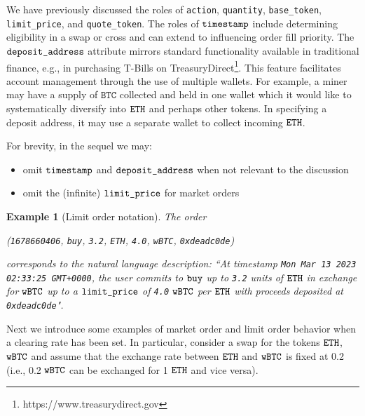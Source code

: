 \documentclass[11pt, reqno]{amsart}
\newtheorem{example}[thm]{Example}
\newcommand{\BTC}{\textnormal{\texttt{wBTC}}}
\newcommand{\ETH}{\textnormal{\texttt{ETH}}}
\newcommand{\timestamp}{\textnormal{\texttt{timestamp}}}
\newcommand{\action}{\textnormal{\texttt{action}}}
\newcommand{\quantity}{\textnormal{\texttt{quantity}}}
\newcommand{\basetoken}{\textnormal{\texttt{base\_token}}}
\newcommand{\limitprice}{\textnormal{\texttt{limit\_price}}}
\newcommand{\quotetoken}{\textnormal{\texttt{quote\_token}}}
\newcommand{\depositaddress}{\textnormal{\texttt{deposit\_address}}}
\newcommand{\buy}{\textnormal{\texttt{buy}}}
\begin{document}
We have previously discussed the roles of \action, \quantity, \basetoken,
\limitprice, and \quotetoken.
The roles of $\timestamp$ include determining eligibility in a swap or
cross and can extend to influencing order fill priority.
The $\depositaddress$ attribute mirrors standard functionality
available in traditional finance, e.g., in purchasing T-Bills on
TreasuryDirect\footnote{https://www.treasurydirect.gov}. This feature
facilitates account management through the use of multiple wallets. For
example, a miner may have a supply of $\texttt{BTC}$ collected and held in one wallet
which it would like to systematically diversify into $\ETH$ and perhaps other
tokens. In specifying a deposit address, it may use a separate wallet to collect
incoming $\ETH$.

For brevity, in the sequel we may:
\begin{itemize}
	\item omit $\timestamp$ and $\depositaddress$ when not relevant to the
        discussion
	\item omit the (infinite) $\limitprice$ for market orders
\end{itemize}

\begin{example}[Limit order notation]
The order
\begin{center}
    (\textnormal{\texttt{1678660406}},
    \buy,
    \textnormal{\texttt{3.2}},
    \ETH,
    \textnormal{\texttt{4.0}},
    \BTC,
    \textnormal{\texttt{0xdeadc0de}})
\end{center}
corresponds to the natural language description:
``At timestamp \textnormal{\texttt{Mon Mar 13 2023 02:33:25 GMT+0000}}, the user
commits to $\buy$ up to \textnormal{\texttt{3.2}} units of $\ETH$ in exchange
for $\BTC$ up to a $\limitprice$ of \textnormal{\texttt{4.0}} $\BTC$ per $\ETH$
with proceeds deposited at \textnormal{\texttt{0xdeadc0de}}".
\end{example}

Next we introduce some examples of market order and limit order behavior when
a clearing rate has been set.
In particular, consider a swap for the tokens $\ETH$, $\BTC$ and assume that
the exchange rate between $\ETH$ and $\BTC$ is fixed at 0.2 (i.e.,
0.2 $\BTC$ can be exchanged for 1 $\ETH$ and vice versa).
\end{document}
